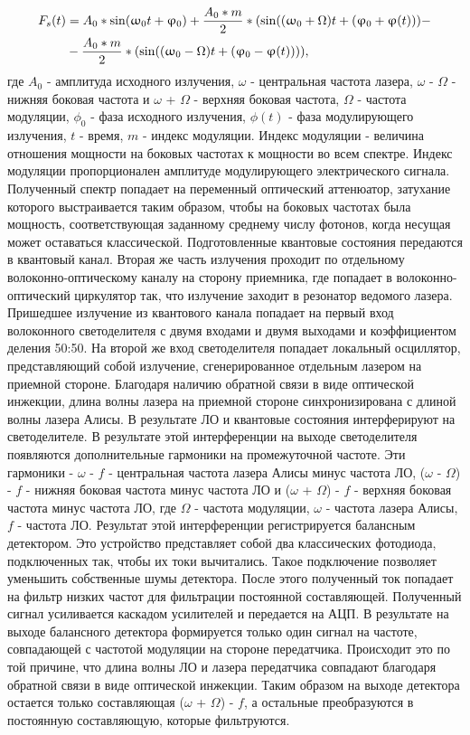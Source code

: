 \begin{align}
\label{eq:spectrum seed}
F_s(t) & = A_0 * \sin(\omega_0 t + \phi_0) + \frac{A_0 * m}{2} * (\sin((\omega_0 + \Omega)t + (\phi_0 + \phi (t))) - \notag \\
&- \frac{A_0 * m}{2} * (\sin((\omega_0 - \Omega)t + (\phi_0 - \phi (t)))),
\end{align}где $A_0$ - амплитуда исходного излучения,  $\omega$ - центральная частота лазера, $\omega$ - $\Omega$ - нижняя боковая частота  и $\omega$ + $\Omega$ - верхняя боковая частота, $\Omega$ - частота модуляции, $\phi_0$ - фаза исходного излучения, $\phi(t)$ - фаза модулирующего излучения, $t$ - время, $m$ - индекс модуляции. Индекс модуляции - величина отношения мощности на боковых частотах к мощности во всем спектре. Индекс модуляции пропорционален амплитуде модулирующего электрического сигнала.  Полученный спектр попадает на переменный оптический аттенюатор, затухание которого выстраивается таким образом, чтобы на боковых частотах была мощность, соответствующая заданному среднему числу фотонов, когда несущая может оставаться классической. Подготовленные квантовые состояния передаются в квантовый канал. 
Вторая же часть излучения проходит по отдельному волоконно-оптическому каналу на сторону приемника, где попадает в волоконно-оптический циркулятор так, что излучение заходит в резонатор ведомого лазера. 
Пришедшее излучение из квантового канала попадает на первый вход волоконного светоделителя с двумя входами и двумя выходами и коэффициентом деления 50:50. На второй же вход светоделителя попадает локальный осциллятор, представляющий собой излучение, сгенерированное отдельным лазером на приемной стороне. Благодаря наличию обратной связи в виде оптической инжекции, длина волны лазера на приемной стороне синхронизирована с длиной волны лазера Алисы. В результате ЛО и квантовые состояния интерферируют на светоделителе. В результате этой интерференции на выходе светоделителя появляются дополнительные гармоники на промежуточной частоте. Эти гармоники -  $\omega$ - $f$ - центральная частота лазера Алисы минус частота ЛО, ($\omega$ - $\Omega$) - $f$  - нижняя боковая частота минус частота ЛО   и ($\omega$ + $\Omega$) - $f$ - верхняя боковая частота минус частота ЛО, где $\Omega$ - частота модуляции, $\omega$ - частота лазера Алисы, $f$ - частота ЛО. 
\newline Результат этой интерференции регистрируется балансным детектором. Это устройство представляет собой два классических фотодиода, подключенных так, чтобы их токи вычитались. Такое подключение позволяет уменьшить собственные шумы детектора. После этого полученный ток попадает на фильтр низких частот для фильтрации постоянной составляющей. Полученный сигнал усиливается каскадом усилителей и передается на АЦП.  В результате на выходе балансного детектора формируется только один сигнал на частоте, совпадающей с частотой модуляции на стороне передатчика. Происходит это по той причине, что длина волны ЛО и лазера передатчика совпадают благодаря обратной связи в виде оптической инжекции. Таким образом на выходе детектора остается только составляющая ($\omega$ + $\Omega$) - $f$, а остальные преобразуются в постоянную составляющую, которые фильтруются. 

